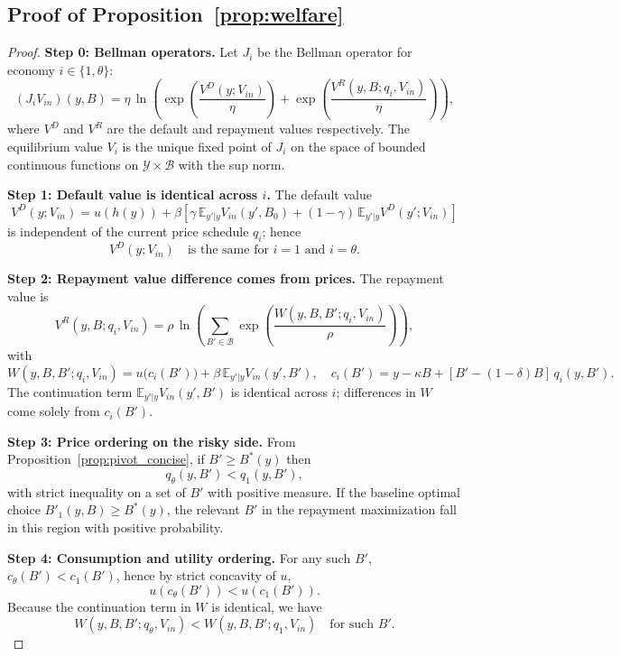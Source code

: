 \documentclass[12pt]{article}
\theoremstyle{plain}
\newcommand{\E}{\mathbb{E}}
\begin{document}
\subsection{Proof of Proposition~\ref{prop:welfare}}\label{app:proof_welfare}
\begin{proof}
	\textbf{Step 0: Bellman operators.}
	Let $J_i$ be the Bellman operator for economy $i\in\{1,\theta\}$:
	\[
		(J_iV_{in})(y,B)
		= \eta \,\ln\!\left(
		\exp\!\left(\frac{V^D(y;V_{in})}{\eta}\right)
		+ \exp\!\left(\frac{V^R(y,B;q_i,V_{in})}{\eta}\right)
		\right),
	\]
	where $V^D$ and $V^R$ are the default and repayment values respectively. The
	equilibrium value $V_i$ is the unique fixed point of $J_i$ on the space of
	bounded continuous functions on $\mathcal{Y}\times\mathcal{B}$ with the sup
	norm.

	\medskip
	\textbf{Step 1: Default value is identical across $i$.}
	The default value
	\[
		V^D(y;V_{in}) = u(h(y)) + \beta\left[\gamma\,\E_{y'|y}V_{in}(y',B_0)
		+ (1-\gamma)\,\E_{y'|y}V^D(y';V_{in})\right]
	\]
	is independent of the current price schedule $q_i$; hence
	\begin{equation}\label{eq:default_equal}
		V^D(y;V_{in}) \quad\text{is the same for $i=1$ and $i=\theta$}.
	\end{equation}

	\medskip
	\textbf{Step 2: Repayment value difference comes from prices.}
	The repayment value is
	\[
		V^R(y,B;q_i,V_{in})
		= \rho\,\ln\!\left(\sum_{B'\in\mathcal{B}} \exp\!\left(\frac{W(y,B,B';q_i,V_{in})}{\rho}\right)\right),
	\]
	with
	\[
		W(y,B,B';q_i,V_{in}) = u\!\big(c_i(B')\big) + \beta\,\E_{y'|y}V_{in}(y',B'),\quad
		c_i(B') = y - \kappa B + [B'-(1-\delta)B]\,q_i(y,B').
	\]
	The continuation term $\E_{y'|y}V_{in}(y',B')$ is identical across $i$;
	differences in $W$ come solely from $c_i(B')$.

	\medskip
	\textbf{Step 3: Price ordering on the risky side.}
	From Proposition~\ref{prop:pivot_concise}, if $B'\ge B^*(y)$ then
	\[
		q_\theta(y,B') < q_1(y,B'),
	\]
	with strict inequality on a set of $B'$ with positive measure. If the baseline
	optimal choice $B'_1(y,B)\ge B^*(y)$, the relevant $B'$ in the repayment
	maximization fall in this region with positive probability.

	\medskip
	\textbf{Step 4: Consumption and utility ordering.}
	For any such $B'$, $c_\theta(B') < c_1(B')$, hence by strict concavity of $u$,
	\[
		u(c_\theta(B')) < u(c_1(B')).
	\]
	Because the continuation term in $W$ is identical, we have
	\begin{equation}\label{eq:choice_value_order}
		W(y,B,B';q_\theta,V_{in}) < W(y,B,B';q_1,V_{in})
		\quad\text{for such $B'$}.
	\end{equation}


\end{proof}
\end{document}
